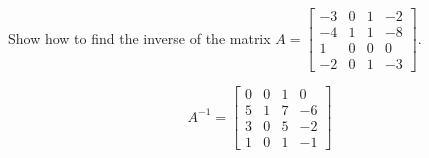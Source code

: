
\begin{exerciseStatement}


Show how to find the inverse of the matrix \(A= \left[\begin{array}{cccc}
-3 & 0 & 1 & -2 \\
-4 & 1 & 1 & -8 \\
1 & 0 & 0 & 0 \\
-2 & 0 & 1 & -3
\end{array}\right] \).


\end{exerciseStatement}
    
\begin{exerciseAnswer} 
\[A^{-1}= \left[\begin{array}{cccc}
0 & 0 & 1 & 0 \\
5 & 1 & 7 & -6 \\
3 & 0 & 5 & -2 \\
1 & 0 & 1 & -1
\end{array}\right] \]
\end{exerciseAnswer}
    
